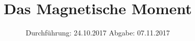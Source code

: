 

\subject{VERSUCH 105}
\title{Das Magnetische Moment}
\date{%
  \hspace{-2.5em}
  Durchführung: 24.10.2017
  \hspace{4em}
  Abgabe: 07.11.2017
}


  \setlength{\parindent}{0em} 
  \maketitle
  \thispagestyle{empty}
  \newpage
  \tableofcontents
  \newpage

  
  
  
  
  \newpage
  

\printbibliography{}


